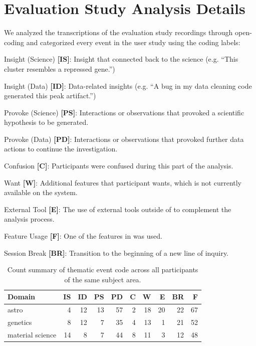 \section{Evaluation Study Analysis Details\label{apdx:studydetails}}
We analyzed the transcriptions of the evaluation study recordings through open-coding and
categorized every event in the user study using the coding labels:
\begin{denselist}
    \item Insight (Science) \textbf{[IS]}: Insight that connected back to the science (e.g. ``This cluster resembles a repressed gene.'')
    \item Insight (Data) \textbf{[ID]}: Data-related insights (e.g. ``A bug in my data cleaning code generated this peak artifact.'')
    \item Provoke (Science) \textbf{[PS]}: Interactions or observations that provoked a scientific hypothesis to be generated.
    \item Provoke (Data) \textbf{[PD]}: Interactions or observations that provoked further data actions to continue the investigation.
    \item Confusion \textbf{[C]}: Participants were confused during this part of the analysis.
    \item Want \textbf{[W]}: Additional features that participant wants, which is not currently available on the system.
    \item External Tool \textbf{[E]}: The use of external tools outside of \zvpp to complement the analysis process.
    \item Feature Usage \textbf{[F]}: One of the features in \zvpp was used.
    \item Session Break \textbf{[BR]}: Transition to the beginning of a new line of inquiry.
\end{denselist}

\begin{table}[h!]
  \begin{tabular}{lrrrrrrrrr}
  \hline
   Domain           &   IS &   ID &   PS &   PD &   C &   W &   E &   BR &   F \\
  \hline
   astro            &    4 &   12 &   13 &   57 &   2 &  18 &  20 &   22 &  67 \\
   genetics         &    8 &   12 &    7 &   35 &   4 &  13 &   1 &   21 &  52 \\
   material science &   14 &    8 &    7 &   44 &   8 &  11 &   3 &   12 &  48 \\
  \hline
  \end{tabular}
  \caption{Count summary of thematic event code across all participants of the same subject area.}
\end{table}

